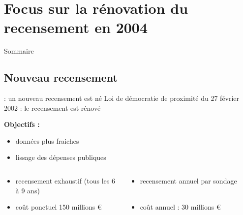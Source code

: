 \documentclass[10pt,xcolor=table,color={dvipsnames,usenames},ignorenonframetext,usepdftitle=false,french]{beamer}
\begin{document}
\hypertarget{focus-sur-la-ruxe9novation-du-recensement-en-2004}{%
\section{Focus sur la rénovation du recensement en
2004}\label{focus-sur-la-ruxe9novation-du-recensement-en-2004}}

\begin{frame}{Sommaire}
\protect\hypertarget{sommaire-1}{}
\end{frame}

\hypertarget{nouveau-recensement}{%
\subsection{Nouveau recensement}\label{nouveau-recensement}}

\begin{frame}{ : un nouveau recensement est né}
\protect\hypertarget{un-nouveau-recensement-est-nuxe9}{}
\bclampe Loi de démocratie de proximité du 27 février 2002 : le
recensement est rénové

\textbf{Objectifs :}

\begin{itemize}

\item données plus fraiches

\item lissage des dépenses publiques

\end{itemize}

\bigskip

\begin{columns}[T]
\begin{column}{0.48\textwidth}

\begin{itemize}
\item recensement exhaustif (tous les 6 à 9 ans)

\smallskip
\item coût ponctuel 150 millions €
\end{itemize}
\end{column}

\begin{column}{0.48\textwidth}

\begin{itemize}
\item recensement annuel par sondage $\phantom{text{blablabla}}$

\smallskip
\item coût annuel : 30 millions €

\end{itemize}
\end{column}
\end{columns}
\end{frame}
\end{document}
